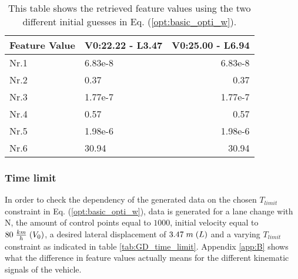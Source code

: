\begin{table}[h!]
	\centering
	\begin{tabular}{@{}llr@{}} \toprule
		\textbf{Feature Value}     & V0:22.22 - L3.47 & V0:25.00 - L6.94\\ \midrule
		Nr.1       & 6.83e-8   & 6.83e-8 \\
		Nr.2       & 0.37        & 0.37  \\
		Nr.3       & 1.77e-7     & 1.77e-7 \\
		Nr.4       & 0.57    & 0.57  \\
		Nr.5       & 1.98e-6     & 1.98e-6 \\
		Nr.6       & 30.94      & 30.94\\ \bottomrule
	\end{tabular}
	\caption{This table shows the retrieved feature values using the two different  initial guesses in Eq. (\ref{opt:basic_opti_w}).}
	\label{tab:GD_local_test}
\end{table}
\newpage
\subsubsection{Time limit}
In order to check the dependency of the generated data on the chosen $T_{limit}$ constraint in Eq. (\ref{opt:basic_opti_w}), data is generated for a lane change with N, the amount of control points equal to $1000$, initial velocity equal to $80 \hspace{1 mm} \frac{km}{h}\hspace{1mm}(V_{0})$, a desired lateral displacement of $3.47\hspace{1mm}m\hspace{1mm}(L)$ and a varying $T_{limit}$ constraint as indicated in table \ref{tab:GD_time_limit}. Appendix \ref{app:B} shows what the difference in feature values actually means for the different kinematic signals of the vehicle.

